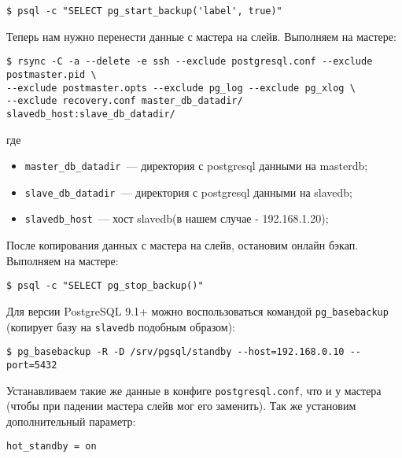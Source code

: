 \begin{lstlisting}[label=lst:streaming10,caption=Выполняем на мастере]
$ psql -c "SELECT pg_start_backup('label', true)"
\end{lstlisting}

Теперь нам нужно перенести данные с мастера на слейв. Выполняем на мастере:

\begin{lstlisting}[label=lst:streaming11,caption=Выполняем на мастере]
$ rsync -C -a --delete -e ssh --exclude postgresql.conf --exclude postmaster.pid \
--exclude postmaster.opts --exclude pg_log --exclude pg_xlog \
--exclude recovery.conf master_db_datadir/ slavedb_host:slave_db_datadir/
\end{lstlisting}

где

\begin{itemize}
  \item \lstinline!master_db_datadir!~--- директория с postgresql данными на masterdb;
  \item \lstinline!slave_db_datadir!~--- директория с postgresql данными на slavedb;
  \item \lstinline!slavedb_host!~--- хост slavedb(в нашем случае - 192.168.1.20);
\end{itemize}

После копирования данных с мастера на слейв, остановим онлайн бэкап. Выполняем на мастере:

\begin{lstlisting}[label=lst:streaming12,caption=Выполняем на мастере]
$ psql -c "SELECT pg_stop_backup()"
\end{lstlisting}

Для версии PostgreSQL 9.1+ можно воспользоваться командой \lstinline!pg_basebackup! (копирует базу на \lstinline!slavedb! подобным образом):

\begin{lstlisting}[label=lst:streaming122,caption=Выполняем на слейве]
$ pg_basebackup -R -D /srv/pgsql/standby --host=192.168.0.10 --port=5432
\end{lstlisting}

Устанавливаем такие же данные в конфиге \lstinline!postgresql.conf!, что и у мастера (чтобы при падении мастера слейв мог его заменить). Так же установим дополнительный параметр:

\begin{lstlisting}[label=lst:streaming13,caption=Конфиг слейва]
hot_standby = on
\end{lstlisting}

